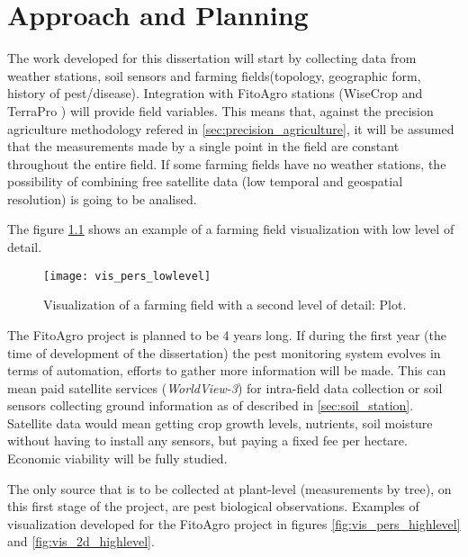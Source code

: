 \chapter{Approach and Planning}
\label{cha:approach_and_planning}

The work developed for this dissertation will start by collecting data from weather stations, soil sensors and farming fields(topology, geographic form, history of pest/disease). Integration with FitoAgro stations (WiseCrop \cite{wisecrop} and TerraPro \cite{terrapro}) will provide field variables. This means that, against the precision agriculture methodology refered in \ref{sec:precision_agriculture}, it will be assumed that the measurements made by a single point in the field are constant throughout the entire field. If some farming fields have no weather stations, the possibility of combining free satellite data (low temporal and geospatial resolution) is going to be analised. 

The figure \ref{fig:vis_pers_lowlevel} shows an example of a farming field visualization with low level of detail. 

\begin{figure}[htbp]
  \centering
  \texttt{[image: vis\_pers\_lowlevel]}
  \caption{Visualization of a farming field with a second level of detail: Plot.}
  \label{fig:vis_pers_lowlevel}
\end{figure}

The FitoAgro project is planned to be 4 years long. If during the first year (the time of development of the dissertation) the pest monitoring system evolves in terms of automation, efforts to gather more information will be made. This can mean paid satellite services (\textit{WorldView-3}) for intra-field data collection or soil sensors collecting ground information as of described in \ref{sec:soil_station}. Satellite data would mean getting crop growth levels, nutrients, soil moisture without having to install any sensors, but paying a fixed fee per hectare. Economic viability will be fully studied.

The only source that is to be collected at plant-level (measurements by tree), on this first stage of the project, are pest biological observations. Examples of visualization developed for the FitoAgro project in figures \ref{fig:vis_pers_highlevel} and \ref{fig:vis_2d_highlevel}.

